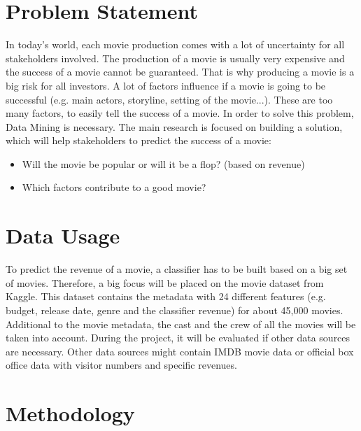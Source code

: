 

 
\section{Problem Statement}
 In today's world, each movie production comes with a lot of uncertainty for all stakeholders involved. The production of a movie is usually very expensive and the success of a movie cannot be guaranteed. That is why producing a movie is a big risk for all investors. 
A lot of factors influence if a movie is going to be successful (e.g. main actors, storyline, setting of the movie...). These are too many factors, to easily tell the success of a movie. In order to solve this problem, Data Mining is necessary. 
The main research is focused on building a solution, which will help stakeholders to predict the success of a movie:

\begin{itemize}
    \item Will the movie be popular or will it be a flop? (based on revenue)
    \item Which factors contribute to a good movie?
\end{itemize}


\section{Data Usage}
To predict the revenue of a movie, a classifier has to be built based on a big set of movies. Therefore, a big focus will be placed on the movie dataset from Kaggle. This dataset contains the metadata with 24 different features (e.g. budget, release date, genre and the classifier revenue) for about 45,000 movies. Additional to the movie metadata, the cast and the crew of all the movies will be taken into account. During the project, it will be evaluated if other data sources are necessary. Other data sources might contain IMDB movie data or official box office data with visitor numbers and specific revenues.


\section{Methodology}

